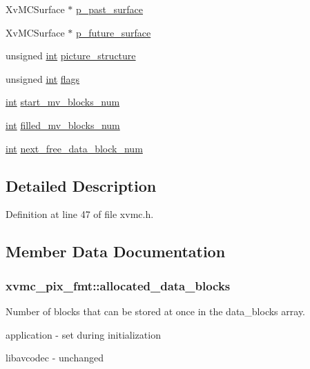 \begin{DoxyCompactItemize}
\item 
Xv\+M\+C\+Surface $\ast$ \hyperlink{structxvmc__pix__fmt_a7cf41a3215c965c406a066e8cb6cb58b}{p\+\_\+past\+\_\+surface}
\item 
Xv\+M\+C\+Surface $\ast$ \hyperlink{structxvmc__pix__fmt_ad186a2b2c6ca8c1be3ef7345ff72cb7a}{p\+\_\+future\+\_\+surface}
\item 
unsigned \hyperlink{xmltok_8h_a5a0d4a5641ce434f1d23533f2b2e6653}{int} \hyperlink{structxvmc__pix__fmt_a6d835e18579427c7fbe5b7987d01b764}{picture\+\_\+structure}
\item 
unsigned \hyperlink{xmltok_8h_a5a0d4a5641ce434f1d23533f2b2e6653}{int} \hyperlink{structxvmc__pix__fmt_a2b23d0152e2f0391de5cd97517142899}{flags}
\item 
\hyperlink{xmltok_8h_a5a0d4a5641ce434f1d23533f2b2e6653}{int} \hyperlink{structxvmc__pix__fmt_ae00f9d665842ed371cf005600f96a47c}{start\+\_\+mv\+\_\+blocks\+\_\+num}
\item 
\hyperlink{xmltok_8h_a5a0d4a5641ce434f1d23533f2b2e6653}{int} \hyperlink{structxvmc__pix__fmt_a817e7fc6d7f524b51dd437ec5a841962}{filled\+\_\+mv\+\_\+blocks\+\_\+num}
\item 
\hyperlink{xmltok_8h_a5a0d4a5641ce434f1d23533f2b2e6653}{int} \hyperlink{structxvmc__pix__fmt_af44880f97013d3b6a51705ceca7d10d7}{next\+\_\+free\+\_\+data\+\_\+block\+\_\+num}
\end{DoxyCompactItemize}



\subsection{Detailed Description}


Definition at line 47 of file xvmc.\+h.



\subsection{Member Data Documentation}
\subsubsection[{\texorpdfstring{allocated\+\_\+data\+\_\+blocks}{allocated_data_blocks}}]{ xvmc\+\_\+pix\+\_\+fmt\+::allocated\+\_\+data\+\_\+blocks}\hypertarget{structxvmc__pix__fmt_af3cade3f29f20d5145ec37da14919c90}{}\label{structxvmc__pix__fmt_af3cade3f29f20d5145ec37da14919c90}
Number of blocks that can be stored at once in the data\+\_\+blocks array.
\begin{DoxyItemize}
\item application -\/ set during initialization
\item libavcodec -\/ unchanged 
\end{DoxyItemize}

